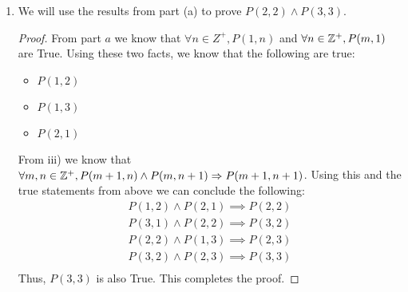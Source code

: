 \documentclass[12pt]{article}
\theoremstyle{definition}
\begin{document}
\begin{enumerate}
\begin{enumerate}[i]
\begin{proof}
            Therefore, the total number of solutions we have for the equation $n+1 = x_1 + x_2 + \cdots + x_{m+1}$ when $x_1 \geq 0$ will be the sum of the solutions to the same equation when $x_1 =0$ and when $x_1 \geq 1$
            \begin{align*}
                P(m, n + 1) + P(m + 1, n)
                &= \frac{(n + m)!}{(n+1)!(m-1)!} + \frac{(n+m)!}{n!m!}\\
                &= \frac{(n+1)(n + m)! + m(n + m)!}{(n+1)n!m(m-1)!} \\
                &= \frac{(n+1+m)(n + m)!}{(n+1)!m!} \\
                &= \frac{(n+1+m)!}{(n+1)!m!} \\
                &= P(m + 1, n + 1)
            \end{align*}
            Which is exactly what we wanted to show.
            \end{proof}
        
    \end{enumerate}
    
    \item We will use the results from part (a) to prove $P(2,2) \land P(3, 3)$.
        \begin{proof}
            From part $a$ we know that $\forall n \in Z^+, P(1, n)$ and  $\forall n \in \mathbb Z^+, P(m, 1)$ are True. Using these two facts, we know that the following are true: 
            \begin{itemize}
                \item $P(1, 2)$
                \item $P(1, 3)$
                \item $P(2, 1)$
            \end{itemize}
            From iii) we know that $\forall m, n \in \mathbb Z^+, P(m+1, n) \land P(m, n+1) \mathrel{\Rightarrow} P(m+1, n+1)$. Using this and the true statements from above we can conclude the following: \\ 
            \begin{align*}
                P(1, 2) \land P(2, 1) \implies P(2, 2) \\
                P(3, 1) \land P(2, 2) \implies P(3, 2) \\ 
                P(2, 2) \land P(1, 3) \implies P(2, 3) \\ 
                P(3, 2) \land P(2, 3) \implies P(3, 3) \\
            \end{align*}
            Thus, $P(3, 3)$ is also True. This completes the proof.
        \end{proof}
    

\end{enumerate}
\end{document}
